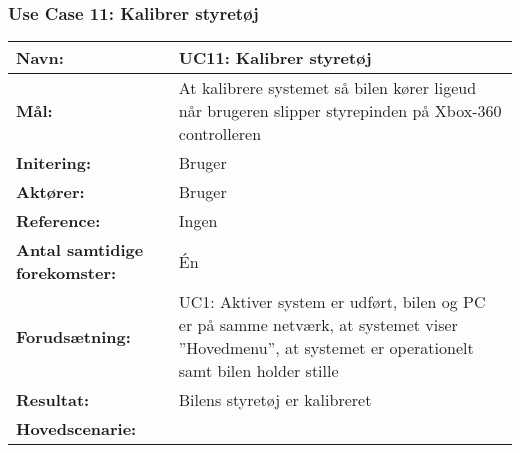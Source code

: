 \subsubsection{Use Case 11: Kalibrer styretøj}
\begin{table}[h]
\begin{tabularx}{\textwidth}{| >{\raggedright\arraybackslash}p{3.3 cm} | >{\raggedright\arraybackslash}X |} \hline

\textbf{Navn:} 						& UC11: Kalibrer styretøj												\\ \hline
\textbf{Mål:}						& At kalibrere systemet så bilen kører ligeud 
									  når brugeren slipper styrepinden på Xbox-360 controlleren 			\\ \hline
\textbf{Initering:}					& Bruger 																\\ \hline
\textbf{Aktører:} 					& Bruger																\\ \hline
\textbf{Reference:} 			    & Ingen																	\\ \hline
\textbf{Antal samtidige forekomster:} & Én 																	\\ \hline
\textbf{Forudsætning:} 				& UC1: Aktiver system er udført, bilen og PC er på samme netværk, 
									  at systemet viser ''Hovedmenu'', at systemet er operationelt 
									  samt bilen holder stille												\\ \hline
\textbf{Resultat:}					& Bilens styretøj er kalibreret 										\\ \hline
\textbf{Hovedscenarie:}				& 


\end{tabularx}
\end{table}
